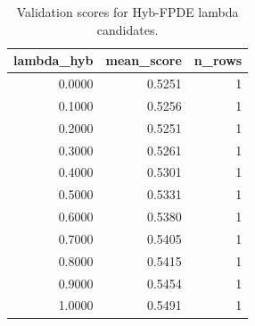 \begin{table}[t]
\caption{Validation scores for Hyb-FPDE lambda candidates.}
\label{tab:lambda_distribution_computed}
\centering
\begin{tabular}{rrr}
\toprule
lambda\_hyb & mean\_score & n\_rows \\
\midrule
0.0000 & 0.5251 & 1 \\
0.1000 & 0.5256 & 1 \\
0.2000 & 0.5251 & 1 \\
0.3000 & 0.5261 & 1 \\
0.4000 & 0.5301 & 1 \\
0.5000 & 0.5331 & 1 \\
0.6000 & 0.5380 & 1 \\
0.7000 & 0.5405 & 1 \\
0.8000 & 0.5415 & 1 \\
0.9000 & 0.5454 & 1 \\
1.0000 & 0.5491 & 1 \\
\bottomrule
\end{tabular}

\end{table}
